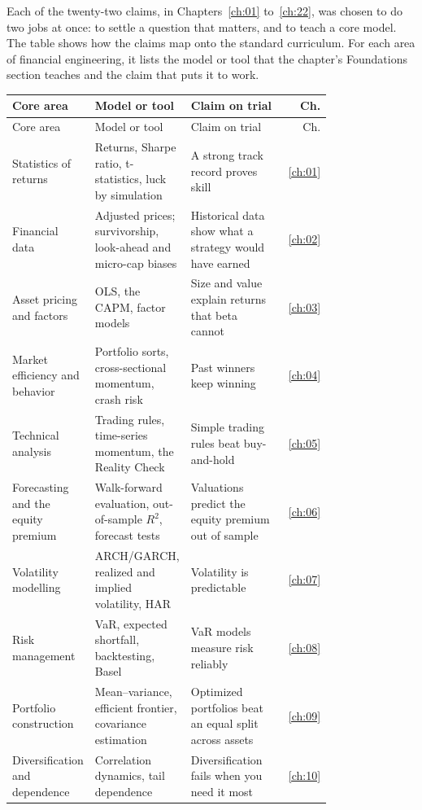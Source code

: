 Each of the twenty-two claims, in Chapters~\ref{ch:01} to~\ref{ch:22}, was chosen to do two jobs at once: to settle a question that matters, and to teach a core model. The table shows how the claims map onto the standard curriculum. For each area of financial engineering, it lists the model or tool that the chapter's Foundations section teaches and the claim that puts it to work.

\begingroup
\small
\setlength{\LTpre}{6pt}\setlength{\LTpost}{6pt}
\begin{longtable}{@{}>{\raggedright\arraybackslash}p{0.198\linewidth}>{\raggedright\arraybackslash}p{0.288\linewidth}>{\raggedright\arraybackslash}p{0.297\linewidth}r@{}}
\toprule
Core area & Model or tool & Claim on trial & Ch. \\
\midrule
\endfirsthead
\toprule
Core area & Model or tool & Claim on trial & Ch. \\
\midrule
\endhead
\bottomrule
\endlastfoot
Statistics of returns & Returns, Sharpe ratio, t-statistics, luck by simulation & A strong track record proves skill & \ref{ch:01} \\
Financial data & Adjusted prices; survivorship, look-ahead and micro-cap biases & Historical data show what a strategy would have earned & \ref{ch:02} \\
Asset pricing and factors & OLS, the CAPM, factor models & Size and value explain returns that beta cannot & \ref{ch:03} \\
Market efficiency and behavior & Portfolio sorts, cross-sectional momentum, crash risk & Past winners keep winning & \ref{ch:04} \\
Technical analysis & Trading rules, time-series momentum, the Reality Check & Simple trading rules beat buy-and-hold & \ref{ch:05} \\
Forecasting and the equity premium & Walk-forward evaluation, out-of-sample $R^2$, forecast tests & Valuations predict the equity premium out of sample & \ref{ch:06} \\
Volatility modelling & ARCH/GARCH, realized and implied volatility, HAR & Volatility is predictable & \ref{ch:07} \\
Risk management & VaR, expected shortfall, backtesting, Basel & VaR models measure risk reliably & \ref{ch:08} \\
Portfolio construction & Mean--variance, efficient frontier, covariance estimation & Optimized portfolios beat an equal split across assets & \ref{ch:09} \\
Diversification and dependence & Correlation dynamics, tail dependence & Diversification fails when you need it most & \ref{ch:10} \\

\end{longtable}
